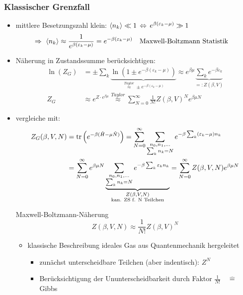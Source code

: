 \subsubsection{Klassischer Grenzfall}
\begin{itemize}
    \item mittlere Besetzungszahl klein: $\expval{n_k} \ll 1 \, \Leftrightarrow \, e^{\beta(\varepsilon_k-\mu)}\gg 1$
    \begin{equation}
        \Rightarrow \ \expval{n_k} \approx \frac{1}{e^{\beta(\varepsilon_k-\mu)}} = e^{-\beta(\varepsilon_k-\mu)} \qq{Maxwell-Boltzmann Statistik}
    \end{equation}
    \item Näherung in Zustandssumme berücksichtigen:
    \begin{align}
        \ln(Z_G) &= \pm \sum_k \underbrace{\ln\left(1 \pm e^{-\beta(\varepsilon_k-\mu)}\right)}_{\stackrel{Taylor}{\approx} \pm e^{-\beta(\varepsilon_k-\mu)}} \approx e^{\beta \mu} \underbrace{\sum_k e^{-\beta \varepsilon_k}}_{=: Z(\beta,V)}\\
        Z_G &\approx e^{Z \cdot e^{\beta\mu}} \stackrel{Taylor}{\approx} \sum_{N=0}^{\infty} \frac{1}{N!} Z(\beta,V)^N e^{\beta\mu N}
    \end{align}
    \item vergleiche mit:
    \begin{align}
        Z_G(\beta,V,N) &= \trace\left(e^{-\beta(\hat{H}-\mu \hat{N})}\right) = \sum_{N=0}^{\infty} \sum_{\substack{n_0,n_1,...\\\sum_k n_k = N}} e^{-\beta \sum_k (\varepsilon_k-\mu)n_k} \\
        &= \sum_{N=0}^{\infty} e^{\beta\mu N} \underbrace{\sum_{\substack{n_0,n_1,...\\\sum_k n_k = N}} e^{-\beta \sum_k \varepsilon_k n_k}}_{\substack{Z(\beta,V,N) \\ \text{kan. ZS f. N Teilchen}}} = \sum_{N=0}^{\infty} Z(\beta,V,N) e^{\beta \mu N}
    \end{align}
    \begin{definition}{Maxwell-Boltzmann-Näherung}
        \begin{equation}
            Z(\beta,V,N) \approx \frac{1}{N!} Z(\beta,V)^N
        \end{equation}
    \end{definition}
    \begin{itemize}
        \item[] klassische Beschreibung ideales Gas aus Quantenmechanik hergeleitet
        \begin{itemize}
            \item zunächst unterscheidbare Teilchen (aber indentisch): $Z^N$
            \item Berücksichtigung der Ununterscheidbarkeit durch Faktor $\frac{1}{N!} \quad \widehat{=} \quad$ Gibbs 
        \end{itemize}
    \end{itemize}
\end{itemize}

